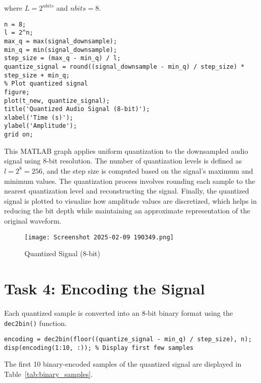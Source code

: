 \documentclass[a4paper,12pt]{article}
\begin{document}
where \( L = 2^{nbits} \) and \( nbits = 8 \).

\begin{lstlisting}[style=matlab, caption=Applying Uniform Quantization]
n = 8;
l = 2^n;
max_q = max(signal_downsample);
min_q = min(signal_downsample);
step_size = (max_q - min_q) / l;
quantize_signal = round((signal_downsample - min_q) / step_size) * step_size + min_q;
% Plot quantized signal
figure;
plot(t_new, quantize_signal);
title('Quantized Audio Signal (8-bit)');
xlabel('Time (s)');
ylabel('Amplitude');
grid on;
\end{lstlisting}
This MATLAB graph applies uniform quantization to the downsampled audio signal using 8-bit resolution. The number of quantization levels is defined as \( l = 2^8 = 256 \), and the step size is computed based on the signal's maximum and minimum values. The quantization process involves rounding each sample to the nearest quantization level and reconstructing the signal. Finally, the quantized signal is plotted to visualize how amplitude values are discretized, which helps in reducing the bit depth while maintaining an approximate representation of the original waveform.

\begin{figure}[H]
    \centering
    \texttt{[image: Screenshot 2025-02-09 190349.png]}
    \caption{Quantized Signal (8-bit)}
\end{figure}

\section{Task 4: Encoding the Signal}
Each quantized sample is converted into an 8-bit binary format using the \texttt{dec2bin()} function.

\begin{lstlisting}[style=matlab, caption=Binary Encoding]
encoding = dec2bin(floor((quantize_signal - min_q) / step_size), n);
disp(encoding(1:10, :)); % Display first few samples
\end{lstlisting}

The first 10 binary-encoded samples of the quantized signal are displayed in Table~\ref{tab:binary_samples}.
\end{document}
